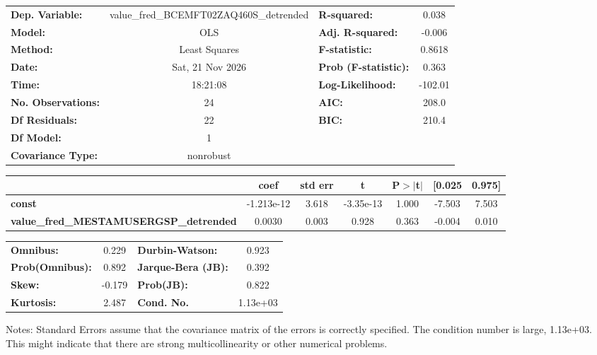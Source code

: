 \begin{center}
\begin{tabular}{lclc}
\toprule
\textbf{Dep. Variable:}                        & value\_fred\_BCEMFT02ZAQ460S\_detrended & \textbf{  R-squared:         } &     0.038   \\
\textbf{Model:}                                &                   OLS                   & \textbf{  Adj. R-squared:    } &    -0.006   \\
\textbf{Method:}                               &              Least Squares              & \textbf{  F-statistic:       } &    0.8618   \\
\textbf{Date:}                                 &             Sat, 21 Nov 2026            & \textbf{  Prob (F-statistic):} &    0.363    \\
\textbf{Time:}                                 &                 18:21:08                & \textbf{  Log-Likelihood:    } &   -102.01   \\
\textbf{No. Observations:}                     &                      24                 & \textbf{  AIC:               } &     208.0   \\
\textbf{Df Residuals:}                         &                      22                 & \textbf{  BIC:               } &     210.4   \\
\textbf{Df Model:}                             &                       1                 & \textbf{                     } &             \\
\textbf{Covariance Type:}                      &                nonrobust                & \textbf{                     } &             \\
\bottomrule
\end{tabular}
\begin{tabular}{lcccccc}
                                               & \textbf{coef} & \textbf{std err} & \textbf{t} & \textbf{P$> |$t$|$} & \textbf{[0.025} & \textbf{0.975]}  \\
\midrule
\textbf{const}                                 &   -1.213e-12  &        3.618     & -3.35e-13  &         1.000        &       -7.503    &        7.503     \\
\textbf{value\_fred\_MESTAMUSERGSP\_detrended} &       0.0030  &        0.003     &     0.928  &         0.363        &       -0.004    &        0.010     \\
\bottomrule
\end{tabular}
\begin{tabular}{lclc}
\textbf{Omnibus:}       &  0.229 & \textbf{  Durbin-Watson:     } &    0.923  \\
\textbf{Prob(Omnibus):} &  0.892 & \textbf{  Jarque-Bera (JB):  } &    0.392  \\
\textbf{Skew:}          & -0.179 & \textbf{  Prob(JB):          } &    0.822  \\
\textbf{Kurtosis:}      &  2.487 & \textbf{  Cond. No.          } & 1.13e+03  \\
\bottomrule
\end{tabular}
\end{center}

Notes: \newline
 [1] Standard Errors assume that the covariance matrix of the errors is correctly specified. \newline
 [2] The condition number is large, 1.13e+03. This might indicate that there are \newline
 strong multicollinearity or other numerical problems.